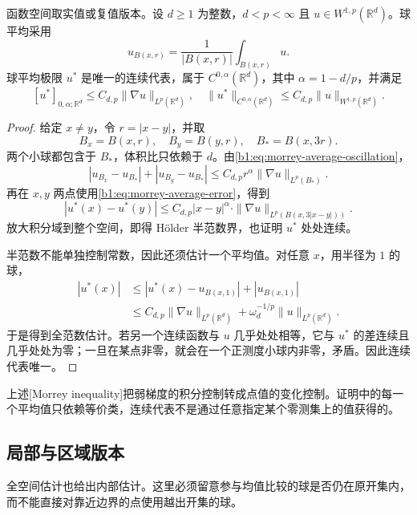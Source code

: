 \begin{theorem}[Morrey]\label{b1:thm:morrey-whole-space}
函数空间取实值或复值版本。设 \(d\ge1\) 为整数，\(d<p<\infty\) 且 \(u\in W^{1,p}(\mathbb R^d)\)。球平均采用
\[
 u_{B(x,r)}=\frac1{|B(x,r)|}\int_{B(x,r)}u.
\]
球平均极限 \(u^*\) 是唯一的连续代表，属于 \(C^{0,\alpha}(\mathbb R^d)\)，其中 \(\alpha=1-d/p\)，并满足
\begin{equation}\label{b1:eq:morrey-whole-space}
 [u^*]_{0,\alpha;\mathbb R^d}
 \le C_{d,p}\|\nabla u\|_{L^p(\mathbb R^d)},
 \quad
 \|u^*\|_{C^{0,\alpha}(\mathbb R^d)}
 \le C_{d,p}\|u\|_{W^{1,p}(\mathbb R^d)}.
\end{equation}
\end{theorem}
\begin{proof}
给定 \(x\ne y\)，令 \(r=|x-y|\)，并取
\[
 B_x=B(x,r),\quad B_y=B(y,r),\quad B_*=B(x,3r).
\]
两个小球都包含于 \(B_*\)，体积比只依赖于 \(d\)。由\eqref{b1:eq:morrey-average-oscillation}，
\[
 |u_{B_x}-u_{B_*}|+|u_{B_y}-u_{B_*}|
 \le C_{d,p}r^\alpha\|\nabla u\|_{L^p(B_*)}.
\]
再在 \(x,y\) 两点使用\eqref{b1:eq:morrey-average-error}，得到
\begin{equation}\label{b1:eq:morrey-local-pair}
 |u^*(x)-u^*(y)|
 \le C_{d,p}|x-y|^\alpha\cdot
                 \|\nabla u\|_{L^p(B(x,3|x-y|))}.
\end{equation}
放大积分域到整个空间，即得 Hölder 半范数界，也证明 \(u^*\) 处处连续。

半范数不能单独控制常数，因此还须估计一个平均值。对任意 \(x\)，用半径为 \(1\) 的球，
\[
 \begin{split}
 |u^*(x)|
 &\le|u^*(x)-u_{B(x,1)}|+|u_{B(x,1)}|\\
 &\le C_{d,p}\|\nabla u\|_{L^p(\mathbb R^d)}
       +\omega_d^{-1/p}\|u\|_{L^p(\mathbb R^d)}.
 \end{split}
\]
于是得到全范数估计。若另一个连续函数与 \(u\) 几乎处处相等，它与 \(u^*\) 的差连续且几乎处处为零；一旦在某点非零，就会在一个正测度小球内非零，矛盾。因此连续代表唯一。
\end{proof}

上述[Morrey inequality]把弱梯度的积分控制转成点值的变化控制。证明中的每一个平均值只依赖等价类，连续代表不是通过任意指定某个零测集上的值获得的。

\subsection{局部与区域版本}
\label{b1:subsec:240303}

全空间估计也给出内部估计。这里必须留意参与均值比较的球是否仍在原开集内，而不能直接对靠近边界的点使用越出开集的球。

